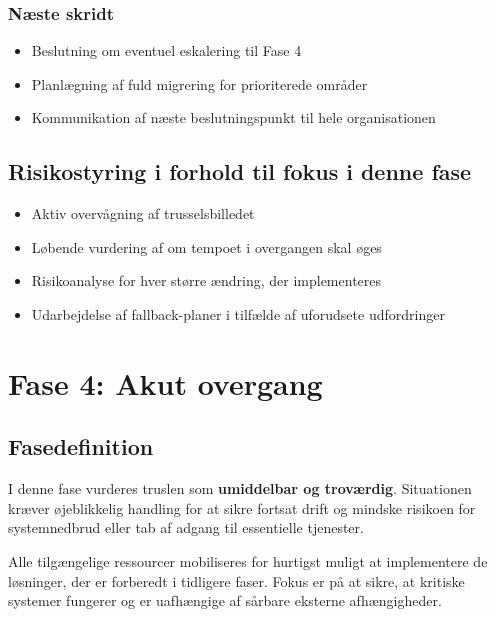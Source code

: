 \documentclass[a4paper,11pt,oneside]{book}
\def\tightlist{}
\begin{document}
\subsection{Næste skridt}\label{nuxe6ste-skridt}

\begin{itemize}
\tightlist
\item
  Beslutning om eventuel eskalering til Fase 4
\item
  Planlægning af fuld migrering for prioriterede områder
\item
  Kommunikation af næste beslutningspunkt til hele organisationen
\end{itemize}

\section{Risikostyring i forhold til fokus i denne
fase}\label{risikostyring-i-forhold-til-fokus-i-denne-fase}

\begin{itemize}
\tightlist
\item
  Aktiv overvågning af trusselsbilledet
\item
  Løbende vurdering af om tempoet i overgangen skal øges
\item
  Risikoanalyse for hver større ændring, der implementeres
\item
  Udarbejdelse af fallback-planer i tilfælde af uforudsete udfordringer
\end{itemize}

\newpage

\chapter{Fase 4: Akut overgang}\label{fase-4-akut-overgang}

\section{Fasedefinition}\label{fasedefinition}

I denne fase vurderes truslen som \textbf{umiddelbar og troværdig}.
Situationen kræver øjeblikkelig handling for at sikre fortsat drift og
mindske risikoen for systemnedbrud eller tab af adgang til essentielle
tjenester.

Alle tilgængelige ressourcer mobiliseres for hurtigst muligt at
implementere de løsninger, der er forberedt i tidligere faser. Fokus er
på at sikre, at kritiske systemer fungerer og er uafhængige af sårbare
eksterne afhængigheder.
\end{document}
